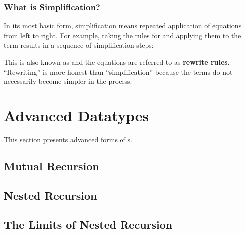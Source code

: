 \subsubsection{What is Simplification?}

In its most basic form, simplification means repeated application of
equations from left to right. For example, taking the rules for \isa{\at}
and applying them to the term \isa{[0,1] \at\ []} results in a sequence of
simplification steps:
This is also known as  and the
equations are referred to as \textbf{rewrite rules}.
``Rewriting'' is more honest than ``simplification'' because the terms do not
necessarily become simpler in the process.






\begin{exercise}
%
\end{exercise}




\section{Advanced Datatypes}
\label{sec:advanced-datatypes}

This section presents advanced forms of s.

\subsection{Mutual Recursion}
\label{sec:datatype-mut-rec}



\subsection{Nested Recursion}
\label{sec:nested-datatype}

{\makeatother}


\subsection{The Limits of Nested Recursion}

